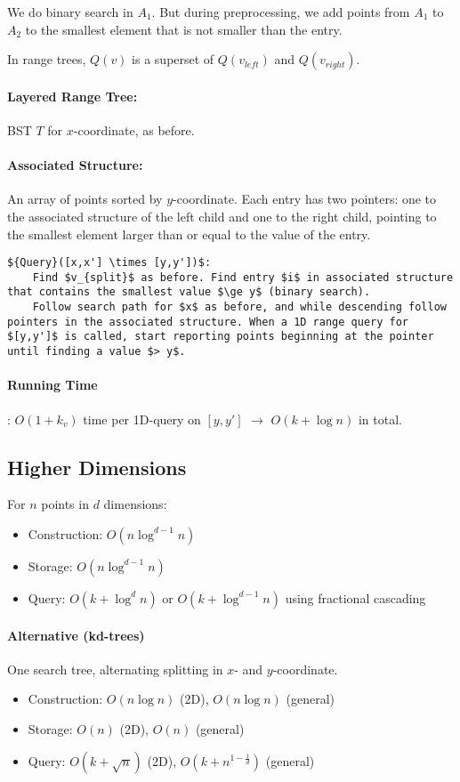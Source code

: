 We do binary search in $A_1$. But during preprocessing, we add points from $A_1$ to $A_2$ to the smallest element that is not smaller than the entry.

In range trees, $Q(v)$ is a superset of $Q(v_{left})$ and $Q(v_{right})$.

\paragraph{Layered Range Tree:} BST $T$ for $x$-coordinate, as before.

\paragraph{Associated Structure:} An array of points sorted by $y$-coordinate. Each entry has two pointers: one to the associated structure of the left child and one to the right child, pointing to the smallest element larger than or equal to the value of the entry.

\begin{lstlisting}[mathescape]
${Query}([x,x'] \times [y,y'])$:
	Find $v_{split}$ as before. Find entry $i$ in associated structure that contains the smallest value $\ge y$ (binary search).
	Follow search path for $x$ as before, and while descending follow pointers in the associated structure. When a 1D range query for $[y,y']$ is called, start reporting points beginning at the pointer until finding a value $> y$.
\end{lstlisting}

\paragraph{Running Time}: $O(1 + k_v)$ time per 1D-query on $[y,y']$ $\rightarrow$ $O(k + \log n)$ in total.

\subsection{Higher Dimensions}

For $n$ points in $d$ dimensions:
\begin{itemize}
	\item Construction: $O(n \log^{d-1} n)$
	\item Storage: $O(n \log^{d-1} n)$
	\item Query: $O(k + \log^d n)$ or $O(k + \log^{d-1} n)$ using fractional cascading
\end{itemize}

\paragraph{Alternative (kd-trees)}

One search tree, alternating splitting in $x$- and $y$-coordinate.

\begin{itemize}
	\item Construction: $O(n \log n)$ (2D), $O(n \log n)$ (general)
	\item Storage: $O(n)$ (2D), $O(n)$ (general)
	\item Query: $O(k + \sqrt{n})$ (2D), $O(k + n^{1 - \frac{1}{d}})$ (general)
\end{itemize}
